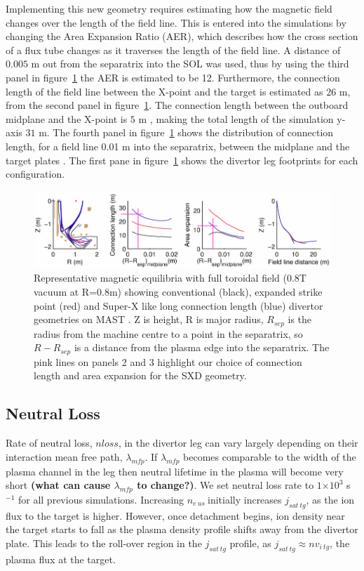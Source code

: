 \documentclass[12pt]{article}  %
\providecommand{\e}[1]{\ensuremath{\times 10^{#1}}} %
\providecommand{\pow}[1]{{$^{#1}$}} %
\providecommand{\neus}{$n_{e~us}~$} %
\begin{document}
Implementing this new geometry requires estimating how the magnetic field changes over the length of the field line. This is entered into the simulations by changing the Area Expansion Ratio (AER), which describes how the cross section of a flux tube changes as it traverses the length of the field line. A distance of $0.005$ m out from the separatrix into the SOL was used, thus by using the third panel in figure~\ref{figMASTUdesignpapersFig2} the AER is estimated to be 12. Furthermore, the connection length of the field line between the X-point and the target is estimated as $26$ m, from the second panel in figure~\ref{figMASTUdesignpapersFig2}. The connection length between the outboard midplane and the X-point is $5$ m \cite{Fishpool2013}, making the total length of the simulation y-axis $31$ m. The fourth panel in figure~\ref{figMASTUdesignpapersFig2} shows the distribution of connection length, for a field line 0.01 m into the separatrix, between the midplane and the target plates \cite{Fishpool2013}. The first pane in figure~\ref{figMASTUdesignpapersFig2} shows the divertor leg footprints for each configuration.

\begin{figure}
\includegraphics[scale=0.75]{Figures/MASTUdesignpapersFig2_2.png}
\centering
\caption{Representative magnetic equilibria with full toroidal field (0.8T vacuum at R=0.8m) showing conventional (black), expanded strike point (red) and Super-X like long connection length (blue) divertor geometries on MAST \cite{Fishpool2013}. Z is height, R is major radius, $ R_{sep} $ is the radius from the machine centre to a point in the separatrix, so $ R - R_{sep} $ is a distance from the plasma edge into the separatrix. The pink lines on panels 2 and 3 highlight our choice of connection length and area expansion for the SXD geometry.}\label{figMASTUdesignpapersFig2}
\end{figure}


\subsection{Neutral Loss}\label{ssecNloss}
Rate of neutral loss, $nloss$, in the divertor leg can vary largely depending on their interaction mean free path, $\lambda_{mfp}$. If $\lambda_{mfp}$ becomes comparable to the width of the plasma channel in the leg then neutral lifetime in the plasma will become very short \textbf{(what can cause $\lambda_{mfp}$ to change?)}. We set neutral loss rate to $1\e{3}$ s\pow{-1} for all previous simulations. Increasing \neus initially increases $j_{sat~tg}$, as the ion flux to the target is higher. However, once detachment begins, ion density near the target starts to fall as the plasma density profile shifts away from the divertor plate. This leads to the roll-over region in the $j_{sat~tg}$ profile, as $j_{sat~tg} \approx nv_{i~tg}$, the plasma flux at the target.
\end{document}
